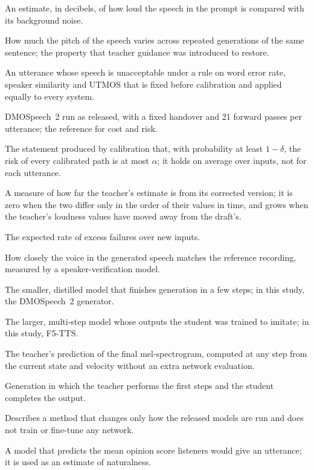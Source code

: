 \begin{description}[leftmargin=0pt,itemsep=2pt,font=\normalfont\itshape]
\item[Prompt SNR.] An estimate, in decibels, of how loud the speech in the prompt is compared with its background noise.
\item[Prosodic variety.] How much the pitch of the speech varies across repeated generations of the same sentence; the property that teacher guidance was introduced to restore.
\item[Quality failure.] An utterance whose speech is unacceptable under a rule on word error rate, speaker similarity and UTMOS that is fixed before calibration and applied equally to every system.
\item[Released system.] DMOSpeech~2 run as released, with a fixed handover and 21 forward passes per utterance; the reference for cost and risk.
\item[Reliability guarantee.] The statement produced by calibration that, with probability at least $1-\delta$, the risk of every calibrated path is at most $\alpha$; it holds on average over inputs, not for each utterance.
\item[Residual.] A measure of how far the teacher's estimate is from its corrected version; it is zero when the two differ only in the order of their values in time, and grows when the teacher's loudness values have moved away from the draft's.
\item[Risk.] The expected rate of excess failures over new inputs.
\item[Speaker similarity.] How closely the voice in the generated speech matches the reference recording, measured by a speaker-verification model.
\item[Student model.] The smaller, distilled model that finishes generation in a few steps; in this study, the DMOSpeech~2 generator.
\item[Teacher model.] The larger, multi-step model whose outputs the student was trained to imitate; in this study, F5-TTS.
\item[Teacher's estimate.] The teacher's prediction of the final mel-spectrogram, computed at any step from the current state and velocity without an extra network evaluation.
\item[Teacher-guided sampling.] Generation in which the teacher performs the first steps and the student completes the output.
\item[Training-free.] Describes a method that changes only how the released models are run and does not train or fine-tune any network.
\item[UTMOS.] A model that predicts the mean opinion score listeners would give an utterance; it is used as an estimate of naturalness.

\end{description}
